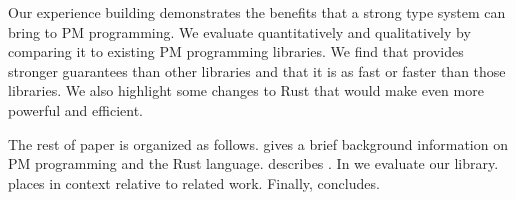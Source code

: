 Our experience building \this{} demonstrates the benefits that a strong type
system can bring to PM programming.  We evaluate \this{} quantitatively and
qualitatively by comparing it to existing PM programming libraries.  We find
that \this{} provides stronger guarantees than other libraries and that it is
as fast or faster than those libraries.  We also highlight some changes
to Rust that would make \this{} even more powerful and efficient.

The rest of paper is organized as follows.  gives a brief
background information on PM programming and the Rust language.
 describes \this{}.  In 
we evaluate our library.  places \this{} in context relative to related work.
 Finally,  concludes.





